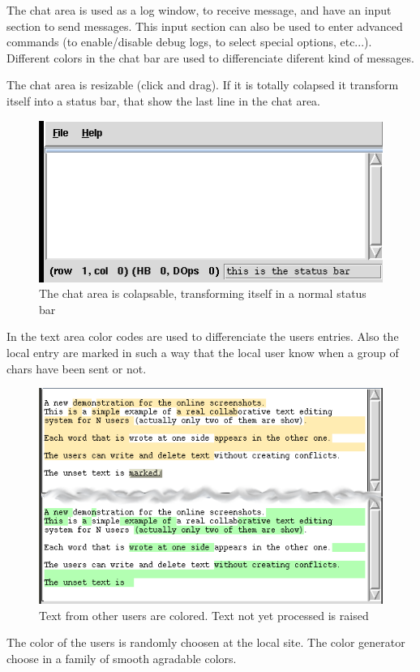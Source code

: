 \documentclass{article}
\begin{document}
  
The chat area is used as a log window, to receive message, and have an input section to send messages. This input section can also be used to enter advanced commands (to enable/disable debug logs, to select special options, etc...). Different colors in the chat bar are used to differenciate diferent kind of messages.

The chat area is resizable (click and drag). If  it is totally colapsed it transform itself into a status bar, that show the last line in the chat area.

\begin{figure}[htbp]
 \begin{center}
    \includegraphics[angle=0,width=0.5\linewidth]{schemas/colapsable_chat_area.png}
 \end{center}
 \label{fig:colapsablechatarea}
 \caption{The chat area is colapsable, transforming itself in a normal status bar}
\end{figure}


In the text area color codes are used to differenciate the users entries. Also the local entry are marked in such a way that the local user know when a group of chars have been sent or not.


\begin{figure}[htbp]
 \begin{center}
    \includegraphics[angle=0,width=0.5\linewidth]{schemas/collaborating_small_shot.png}
 \end{center}
 \label{fig:collaboratingsmallshot}
 \caption{Text from other users are colored. Text not yet processed is raised}
\end{figure}



The color of the users is randomly choosen at the local site. The color generator choose in a family of smooth agradable colors. 
\end{document}
